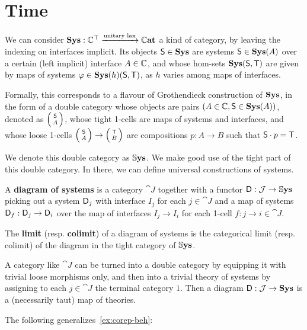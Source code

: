\section{Time}
We can consider $\Sys : \theoryover{\Comp}$ a kind of category, by leaving the indexing on interfaces implicit.
Its objects $\mathsf{S} \in {\mathbf{Sys}}$ are systems $\mathsf{S} \in {\mathbf{Sys}}(A)$ over a certain (left implicit) interface $A \in \Comp$, and whose hom-sets ${\mathbf{Sys}}(\mathsf{S}, \mathsf{T})$ are given by maps of systems $\varphi \in {\mathbf{Sys}}(h)(\mathsf{S}, \mathsf{T})$, as $h$ varies among maps of interfaces.

Formally, this corresponds to a flavour of Grothendieck construction of ${\mathbf{Sys}}$, in the form of a double category whose objects are pairs $(A \in \Comp, \sys S \in \Sys(A))$, denoted as $\lens{\sys S}{A}$, whose tight 1-cells are maps of systems and interfaces, and whose loose 1-cells $\lens{\sys S}{A} \to \lens{\sys T}{B}$ are compositions $p:A \to B$ such that $\mathsf{S}\cdot p = \mathsf{T}$.

We denote this double category as $\dblSys$.
We make good use of the tight part of this double category.
In there, we can define universal constructions of systems.

\begin{definition}
	A \textbf{diagram of systems} is a category $\cat J$ together with a functor $\sys D : \cat J \to \dblSys$ picking out a system $\mathsf{D}_j$ with interface $I_j$ for each $j \in \cat J$ and a map of systems $\mathsf{D}_f : \mathsf{D}_j \to \mathsf{D}_i$ over the map of interfaces $I_j \to I_i$ for each 1-cell $f:j \to i \in \cat J$.
\end{definition}

\begin{definition}
	The \textbf{limit} (resp. \textbf{colimit}) of a diagram of systems is the categorical limit (resp. colimit) of the diagram in the tight category of $\dblSys$.
\end{definition}


\begin{remark}
	A category like $\cat J$ can be turned into a double category by equipping it with trivial loose morphisms only, and then into a trivial theory of systems by assigning to each $j \in \cat J$ the terminal category $1$.
	Then a diagram $\sys D : \cat J \to \Sys$ is a (necessarily taut) map of theories.
\end{remark}

The following generalizes~\cref{ex:corep-beh}:

